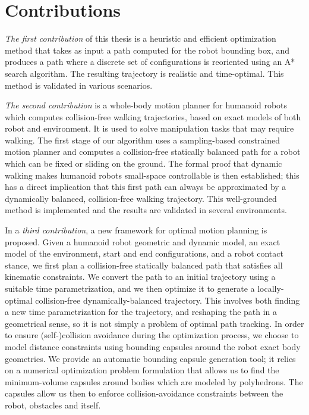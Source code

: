 \section{Contributions}

\emph{The first contribution} of this thesis is a heuristic and
efficient optimization method that takes as input a path computed for
the robot bounding box, and produces a path where a discrete set of
configurations is reoriented using an A* search algorithm. The
resulting trajectory is realistic and time-optimal. This method is
validated in various scenarios.

\emph{The second contribution} is a whole-body motion planner for
humanoid robots which computes collision-free walking trajectories,
based on exact models of both robot and environment. It is used to
solve manipulation tasks that may require walking. The first stage of
our algorithm uses a sampling-based constrained motion planner and
computes a collision-free statically balanced path for a robot which
can be fixed or sliding on the ground. The formal proof that dynamic
walking makes humanoid robots small-space controllable is then
established; this has a direct implication that this first path can
always be approximated by a dynamically balanced, collision-free
walking trajectory. This well-grounded method is implemented and the
results are validated in several environments.

In a \emph{third contribution}, a new framework for optimal motion
planning is proposed. Given a humanoid robot geometric and dynamic
model, an exact model of the environment, start and end
configurations, and a robot contact stance, we first plan a
collision-free statically balanced path that satisfies all
kinematic constraints. We convert the path to an initial trajectory
using a suitable time parametrization, and we then optimize it
to generate a locally-optimal collision-free
dynamically-balanced trajectory. This involves both finding a
new time parametrization for the trajectory, and reshaping the path in
a geometrical sense, so it is not simply a problem of optimal path
tracking. In order to ensure (self-)collision avoidance during the
optimization process, we choose to model distance constraints using
bounding capsules around the robot exact body geometries. We provide
an automatic bounding capsule generation tool; it relies on a
numerical optimization problem formulation that allows us to find the
minimum-volume capsules around bodies which are modeled by
polyhedrons. The capsules allow us then to enforce collision-avoidance
constraints between the robot, obstacles and itself.

